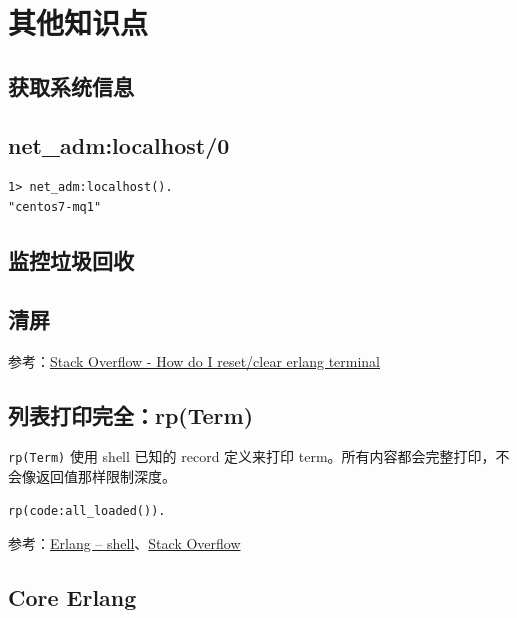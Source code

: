 \section{其他知识点}

\subsection{获取系统信息}

\subsection{net\_adm:localhost/0}

\begin{lstlisting}
1> net_adm:localhost().
"centos7-mq1"
\end{lstlisting}

\subsection{监控垃圾回收}

\subsection{清屏}

参考：\href{https://stackoverflow.com/questions/37829916/how-do-i-reset-clear-erlang-terminal}{Stack Overflow - How do I reset/clear erlang terminal}

\subsection{列表打印完全：rp(Term)}

\lstinline|rp(Term)| 使用 shell 已知的 record 定义来打印 term。所有内容都会完整打印，不会像返回值那样限制深度。

\begin{lstlisting}
rp(code:all_loaded()).
\end{lstlisting}

参考：\href{https://www.erlang.org/doc/man/shell.html}{Erlang -- shell}、\href{https://stackoverflow.com/questions/75566211/how-does-it-show-completely-on-erl-terminal-in-erlang}{Stack Overflow}

\subsection{Core Erlang}


